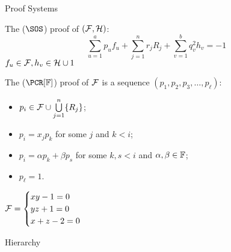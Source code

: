 \begin{frame}{Proof Systems}

    The  ($\SOS$) proof of $(\Fs, \Hs)$:
    $$
        \sum_{u = 1}^{a} p_u f_u + \sum_{j = 1}^{n} r_j R_j + \sum_{v = 1}^{b} q_v^2 h_v = -1
    $$
    $f_u \in \Fs, h_v \in \Hs \cup {1}$

    \pause
    \vspace{0.4cm}

    The  ($\PCR[\field]$) proof of $\Fs$ is a sequence
    $(p_1, p_2, p_3, \dots, p_{\ell})$:
    \pause
    \begin{itemize}
        \item $p_i \in \Fs \cup \bigcup\limits_{j = 1}^{n} \{R_j\}$;
        \pause
        \item $p_i = x_j p_k$ for some $j$ and $k < i$;
        \pause    
        \item $p_i = \alpha p_k + \beta p_s$ for some $k, s < i$ and $\alpha, \beta \in \field$;
        \pause
            \item $p_{\ell} = 1$.
    \end{itemize}

    \pause
    \vspace{-0.2cm}
    \begin{minipage}{0.4\linewidth}
        $\Fs =
        \begin{cases}
            xy - 1 = 0 \\
            yz + 1 = 0 \\
            x + z - 2 = 0
        \end{cases}$
    \end{minipage}
    \begin{minipage}{0.58\linewidth}
        \begin{prooftree}
        \end{prooftree}
    \end{minipage}



\end{frame}


\begin{frame}{Hierarchy}

    
    
\end{frame}



